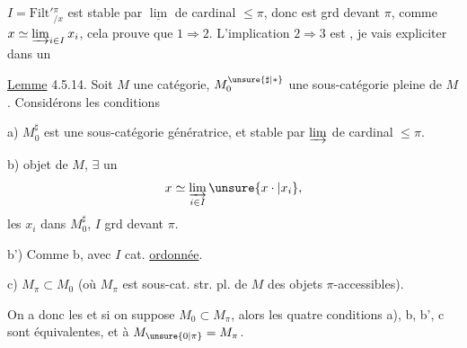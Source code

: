 $I=\mathrm{Filt}'{}^\pi_{/x}$ est stable par $\underline{\lim}$ de cardinal $\leq\pi$, donc est grd devant $\pi$, comme $x\simeq\varinjlim_{i\in I}x_i$, cela prouve que $1\Rightarrow2$. L'implication $2\Rightarrow3$ est ,  je vais expliciter dans un

\uline{Lemme} 4.5.14. Soit $M$ une catégorie,  $M_0^{\unsure{\sharp|*}}$ une sous-catégorie  pleine de $M$. 
Considérons les conditions

a) $M_0^\sharp$ est une sous-catégorie  génératrice,  et stable  par $\varinjlim$ de cardinal $\leq\pi$.

b)   objet de $M$,  $\exists$ un
\[
x\simeq\varinjlim_{i\in I}\unsure{x\cdot|x_i},
\]
les $x_i$ dans $M_0^\sharp$,  $I$ grd devant $\pi$.

b') Comme b, avec $I$ cat. \uline{ordonnée}.

c) $M_\pi\subset M_0$ (où $M_\pi$ est  sous-cat. str. pl. de $M$  des objets $\pi$-accessibles).

On a donc les 
et si on suppose $M_0\subset M_\pi$,  alors les quatre conditions a), b, b', c sont équivalentes, et  à $M_{\unsure{0|\pi}}=M_\pi$.
